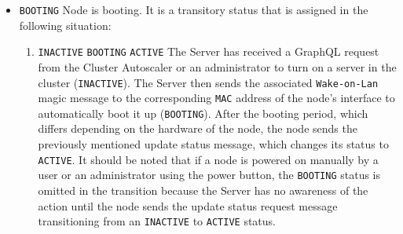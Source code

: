 \begin{itemize}
\begin{itemize}
      \item \texttt{BOOTING}
        \newline
        Node is booting.
        \newline
        It is a transitory status that is assigned in the following situation:
        \begin{enumerate}
          \item \texttt{INACTIVE}  \texttt{BOOTING}
             \texttt{ACTIVE}
            \newline
            The Server has received a GraphQL request from the Cluster
            Autoscaler or an administrator to turn on a server in the cluster (\texttt{INACTIVE}).
            The Server then sends the associated \texttt{Wake-on-Lan} magic message
            to the corresponding \texttt{MAC} address of the node's interface to
            automatically boot it up (\texttt{BOOTING}). After the booting
            period, which differs depending on the hardware of the node, the
            node sends the previously mentioned update status message, which changes
            its status to \texttt{ACTIVE}.
            \newline
            It should be noted that if a node is powered on manually by a user or
            an administrator using the power button, the \texttt{BOOTING} status
            is omitted in the transition because the Server has no awareness of the
            action until the node sends the update status request message transitioning
            from an \texttt{INACTIVE} to \texttt{ACTIVE} status.
        \end{enumerate}


\end{itemize}
\end{itemize}
